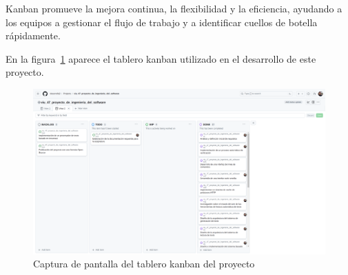 Kanban promueve la mejora continua, la flexibilidad y la eficiencia, ayudando a los equipos a gestionar el flujo de
trabajo y a identificar cuellos de botella rápidamente.

En la figura~\ref{fig:chapter_3.kanban} aparece el tablero kanban utilizado en el desarrollo de este proyecto.

\begin{figure}
    \begin{center}
        \includegraphics[width=\textwidth]{./chapter/3/images/chapter_3.kanban}
        \caption{Captura de pantalla del tablero kanban del proyecto}
        \label{fig:chapter_3.kanban}
    \end{center}
\end{figure}